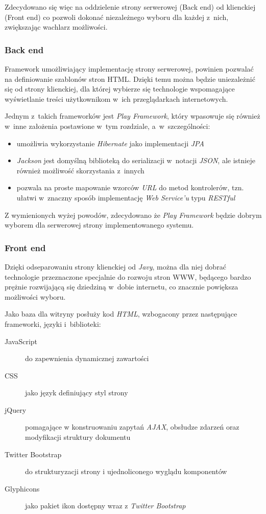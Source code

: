 \documentclass[11pt]{aghdpl}
\begin{document}
Zdecydowano się więc na oddzielenie strony serwerowej (Back end) od klienckiej (Front end) co pozwoli dokonać niezależnego wyboru dla każdej z~nich, zwiększając wachlarz możliwości.

\subsubsection{Back end}

Framework umożliwiający implementację strony serwerowej, powinien pozwalać na definiowanie szablonów stron HTML. Dzięki temu można będzie uniezależnić się od strony klienckiej, dla której wybierze się technologie wspomagające wyświetlanie treści użytkownikom w~ich przeglądarkach internetowych.

Jednym z~takich frameworków jest \emph{Play Framework}, który wpasowuje się również w~inne założenia postawione w~tym rozdziale, a~w~szczególności:

\begin{itemize}
	\item umożliwia wykorzystanie \emph{Hibernate} jako implementacji \emph{JPA}
	\item \emph{Jackson} jest domyślną biblioteką do serializacji w~notacji \emph{JSON}, ale istnieje również możliwość skorzystania z~innych
	\item pozwala na proste mapowanie wzorców \emph{URL} do metod kontrolerów, tzn. ułatwi w~znaczny sposób implementację \emph{Web Service'u} typu \emph{RESTful}
\end{itemize}

Z wymienionych wyżej powodów, zdecydowano że \emph{Play Framework} będzie dobrym wyborem dla serwerowej strony implementowanego systemu.

\subsubsection{Front end}
Dzięki odseparowaniu strony klienckiej od \emph{Javy}, można dla niej dobrać technologie przeznaczone specjalnie do rozwoju stron WWW, będącego bardzo prężnie rozwijającą się dziedziną w~dobie internetu, co znacznie powiększa możliwości wyboru.

Jako baza dla witryny posłuży kod \emph{HTML}, wzbogacony przez następujące frameworki, języki i~biblioteki:

\begin{description}
\item[JavaScript] do zapewnienia dynamicznej zawartości
\item[CSS] jako język definiujący styl strony
\item[jQuery] pomagające w konstruowaniu zapytań \emph{AJAX}, obsłudze zdarzeń oraz modyfikacji struktury dokumentu
\item[Twitter Bootstrap] do strukturyzacji strony i ujednoliconego wyglądu komponentów
\item[Glyphicons] jako pakiet ikon dostępny wraz z \emph{Twitter Bootstrap}
\end{description}
\end{document}
